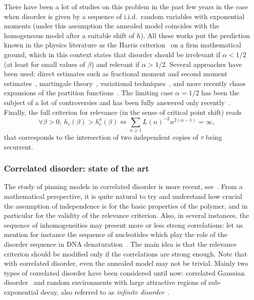 \documentclass[11pt]{article}
\theoremstyle{definition}
\numberwithin{equation}{section}
\numberwithin{figure}{section}
\numberwithin{table}{section}
\newcommand{\ga}{\alpha}
\newcommand{\gb}{\beta}
\let\oldforall\forall
\renewcommand*{\forall}{\mathrel{\oldforall}}
\begin{document}
There have been a lot of studies on this problem in the past few years in the case when disorder is given by a sequence of i.i.d.~random variables with exponential moments (under this assumption the annealed model coincides with the homogeneous model after a suitable shift of $h$). All these works put the prediction known in the physics literature as the Harris criterion~\cite{H74} on a firm mathematical ground, which in this context states that disorder should be irrelevant if $\ga < 1/2$ (at least for small values of $\beta$) and relevant if $\ga > 1/2$. Several approaches have been used: direct estimates such as fractional moment and second moment estimates~\cite{AS06, AZ09, BL15, BCPSZ14, CadH13, DGLT09, GiT2006, GTL09}, martingale theory~\cite{L10}, variational techniques~\cite{CdH13}, and more recently chaos expansions of the partition functions~\cite{CSZ16+,CSZ16,CTT16+}. The limiting case $\ga = 1/2$ has been the subject of a lot of controversies and has been fully answered only recently~\cite{BL15}. Finally, the full criterion for relevance (in the sense of critical point shift) reads
\begin{equation}
\forall \gb > 0,\ h_c(\gb) > h_c^a(\gb) \iff \sum_{n \geq 1} L(n)^{- 2} n^{2 (\ga - 1)} = \infty,
\end{equation}
that corresponds to the intersection of two independent copies of $\tau$ being recurrent.

\subsubsection{Correlated disorder: state of the art}

The study of pinning models in correlated disorder is more recent, see~\cite{B13, B14, BL12, BP15, P13}. From a mathematical perspective, it is quite natural to try and understand how crucial the assumption of independence is for the basic properties of the polymer, and in particular for the validity of the relevance criterion. Also, in several instances, the sequence of inhomogeneities may present more or less strong correlations: let us mention for instance the sequence of nucleotides which play the role of the disorder sequence in DNA denaturation~\cite{JPS06}. The main idea is that the relevance criterion should be modified only if the correlations are strong enough. Note that with correlated disorder, even the annealed model may not be trivial. Mainly two types of correlated disorder have been considered until now: correlated Gaussian disorder~\cite{B13, BP15, P13} and random environments with large attractive regions of sub-exponential decay, also referred to as \emph{infinite disorder}~\cite{B14, BL12}.
\end{document}
